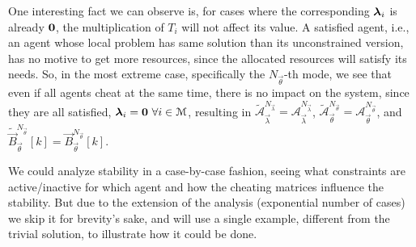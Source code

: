 \documentclass[../main.tex]{subfiles}
\begin{document}
\begin{remark}\label{rem:cheat_satisfied_problem}
  One interesting fact we can observe is, for cases where the corresponding $\boldsymbol{\lambda}_{i}$ is already $\mathbf{0}$, the multiplication of $T_{i}$ will not affect its value.
  A satisfied agent, i.e., an agent whose local problem has same solution than its unconstrained version, has no motive to get more resources, since the allocated resources will satisfy its needs.
  So, in the most extreme case, specifically the $N_{\vec{\theta}}$-th mode, we see that
  even if all agents cheat at the same time, there is no impact on the system, since they are all satisfied, $\boldsymbol{\lambda}_{i}=\mathbf{0}\ \forall i \in \mathcal{M}$, resulting in
  $\tilde{\mathcal{A}}_{\vec{\lambda}}^{N_{\vec{\lambda}}}=\mathcal{A}_{\vec{\lambda}}^{N_{\vec{\lambda}}}$,
  $\tilde{\mathcal{A}}_{\vec{\theta}}^{N_{\vec{\theta}}}=\mathcal{A}_{\vec{\theta}}^{N_{\vec{\theta}}}$, and
  $\tilde{\vec{B}}_{\vec{\theta}}^{N_{\vec{\theta}}}[k]=\vec{B}_{\vec{\theta}}^{N_{\vec{\theta}}}[k]$.
\end{remark}

\newpage
We could analyze stability in a case-by-case fashion, seeing what constraints are active/inactive for which agent and how the cheating matrices influence the stability.
But due to the extension of the analysis (exponential number of cases) we skip it for brevity's sake, and will use a single example, different from the trivial solution, to illustrate how it could be done.
\end{document}
